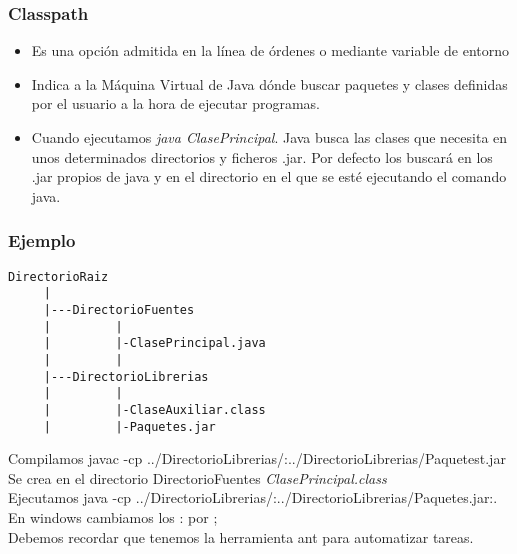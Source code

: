 \documentclass{beamer}
\begin{document}
\begin{frame}
\frametitle{Classpath}
\begin{itemize}[<+-| alert@+>]
\item Es una opción admitida en la línea de órdenes o mediante variable de entorno
\item Indica a la Máquina Virtual de Java dónde buscar paquetes y clases definidas por el usuario a la hora de ejecutar programas.

\item Cuando ejecutamos \emph{java ClasePrincipal}. Java busca las clases que necesita en unos determinados directorios y ficheros .jar. Por defecto los buscará en los .jar propios de java y en el directorio en el que se esté ejecutando el comando java. 
\end{itemize}
\pause
\end{frame}


\begin{frame}[fragile]
\frametitle{Ejemplo}
\begin{footnotesize}
\begin{verbatim}
DirectorioRaiz
     |
     |---DirectorioFuentes
     |         |
     |         |-ClasePrincipal.java
     |         |
     |---DirectorioLibrerias
     |         |
     |         |-ClaseAuxiliar.class
     |         |-Paquetes.jar
\end{verbatim}
\pause
\alert{Compilamos} javac -cp ../DirectorioLibrerias/:../DirectorioLibrerias/Paquetest.jar\\
\pause
Se crea en el directorio \alert{DirectorioFuentes} \emph{ClasePrincipal.class}\\
\pause
\alert{Ejecutamos} java -cp ../DirectorioLibrerias/:../DirectorioLibrerias/Paquetes.jar:.\\
\pause 
En windows cambiamos los \alert{:} por \alert{;}\\
\pause
Debemos recordar que tenemos la herramienta \alert{ant} para automatizar tareas.
\end{footnotesize}

\end{frame}
\end{document}
